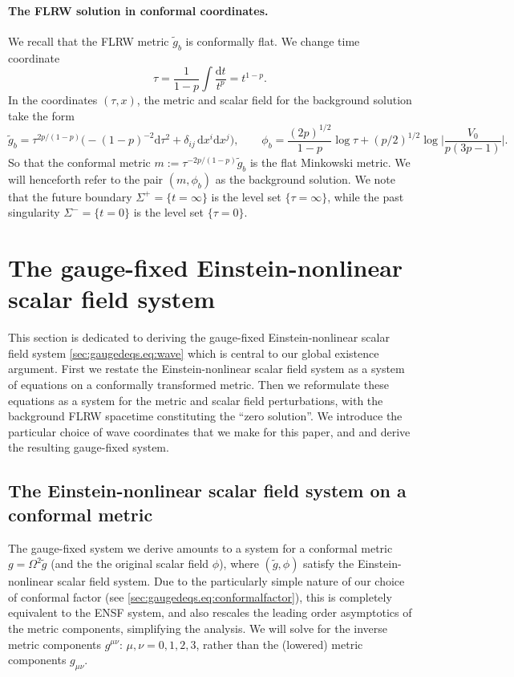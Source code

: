 \documentclass{article}
\newcommand{\de}{\mathrm{d}}
\newcommand{\wt}{\widetilde}
\begin{document}
\paragraph{The FLRW solution in conformal coordinates.} We recall that the FLRW metric $\wt{g}_b$ is conformally flat. We change time coordinate
\begin{equation}
    \tau = \frac{1}{1-p}\int \frac{\de t}{t^p} = t^{1-p}.
\end{equation}
In the coordinates $(\tau,x)$, the metric and scalar field for the background solution take the form 
\begin{equation}\label{sec:prelims.eq:backgroundconf}
\wt{g}_b = \tau^{2p/(1-p)}\big(-(1-p)^{-2}\de \tau^2 + \delta_{ij}\,\de x^i\de x^j\big),\qquad \phi_b = \frac{(2p)^{1/2}}{1-p}\log \tau + (p/2)^{1/2}\log\Big|\frac{V_0}{p(3p-1)}\Big|.
\end{equation}
So that the conformal metric $m := \tau^{-2p/(1-p)}\wt{g}_b$ is the flat Minkowski metric. We will henceforth refer to the pair $(m,\phi_b)$ as the background solution. We note that the future boundary $\Sigma^+ = \{t = \infty\}$ is the level set $\{\tau = \infty\}$, while the past singularity $\Sigma^- = \{t = 0\}$ is the level set $\{\tau = 0\}$.
\section{The gauge-fixed Einstein-nonlinear scalar field system}\label{sec:gaugedeqs}
This section is dedicated to deriving the gauge-fixed Einstein-nonlinear scalar field system \eqref{sec:gaugedeqs.eq:wave} which is central to our global existence argument. First we restate the Einstein-nonlinear scalar field system as a system of equations on a conformally transformed metric. Then we reformulate these equations as a system for the metric and scalar field perturbations, with the background FLRW spacetime constituting the ``zero solution''. We introduce the particular choice of wave coordinates that we make for this paper, and and derive the resulting gauge-fixed system.
\subsection{The Einstein-nonlinear scalar field system on a conformal metric}
The gauge-fixed system we derive amounts to a system for a conformal metric $g = \Omega^2 \wt{g}$ (and the the original scalar field $\phi$), where $(\wt{g},\phi)$ satisfy the Einstein-nonlinear scalar field system. Due to the particularly simple nature of our choice of conformal factor (see \eqref{sec:gaugedeqs.eq:conformalfactor}), this is completely equivalent to the ENSF system, and also rescales the leading order asymptotics of the metric components, simplifying the analysis. We will solve for the inverse metric components $g^{\mu\nu}$: $\mu,\nu = 0,1,2,3$, rather than the (lowered) metric components $g_{\mu\nu}$.
\end{document}
